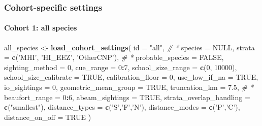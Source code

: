 \documentclass[
]{book}
\newenvironment{Shaded}{\begin{snugshade}}{\end{snugshade}}
\newcommand{\CommentTok}[1]{\textcolor[rgb]{0.56,0.35,0.01}{\textit{#1}}}
\newcommand{\DataTypeTok}[1]{\textcolor[rgb]{0.13,0.29,0.53}{#1}}
\newcommand{\DecValTok}[1]{\textcolor[rgb]{0.00,0.00,0.81}{#1}}
\newcommand{\FloatTok}[1]{\textcolor[rgb]{0.00,0.00,0.81}{#1}}
\newcommand{\KeywordTok}[1]{\textcolor[rgb]{0.13,0.29,0.53}{\textbf{#1}}}
\newcommand{\NormalTok}[1]{#1}
\newcommand{\OperatorTok}[1]{\textcolor[rgb]{0.81,0.36,0.00}{\textbf{#1}}}
\newcommand{\OtherTok}[1]{\textcolor[rgb]{0.56,0.35,0.01}{#1}}
\newcommand{\StringTok}[1]{\textcolor[rgb]{0.31,0.60,0.02}{#1}}
\begin{document}
\hypertarget{cohort-specific-settings-2}{%
\subsubsection*{Cohort-specific settings}\label{cohort-specific-settings-2}}

\hypertarget{cohort-1-all-species-1}{%
\paragraph{Cohort 1: all species}\label{cohort-1-all-species-1}}

\begin{Shaded}
\begin{Highlighting}[]
\NormalTok{all_species <-}\StringTok{ }\KeywordTok{load_cohort_settings}\NormalTok{(}
  \DataTypeTok{id =} \StringTok{"all"}\NormalTok{, }\CommentTok{# *}
  \DataTypeTok{species =} \OtherTok{NULL}\NormalTok{, }
  \DataTypeTok{strata =} \KeywordTok{c}\NormalTok{(}\StringTok{'MHI'}\NormalTok{, }\StringTok{'HI_EEZ'}\NormalTok{, }\StringTok{'OtherCNP'}\NormalTok{), }\CommentTok{# *}
  \DataTypeTok{probable_species =} \OtherTok{FALSE}\NormalTok{,}
  \DataTypeTok{sighting_method =} \DecValTok{0}\NormalTok{,}
  \DataTypeTok{cue_range =} \DecValTok{0}\OperatorTok{:}\DecValTok{7}\NormalTok{,}
  \DataTypeTok{school_size_range =} \KeywordTok{c}\NormalTok{(}\DecValTok{0}\NormalTok{, }\DecValTok{10000}\NormalTok{),}
  \DataTypeTok{school_size_calibrate =} \OtherTok{TRUE}\NormalTok{,}
  \DataTypeTok{calibration_floor =} \DecValTok{0}\NormalTok{,}
  \DataTypeTok{use_low_if_na =} \OtherTok{TRUE}\NormalTok{,}
  \DataTypeTok{io_sightings =} \DecValTok{0}\NormalTok{,}
  \DataTypeTok{geometric_mean_group =} \OtherTok{TRUE}\NormalTok{,}
  \DataTypeTok{truncation_km =} \FloatTok{7.5}\NormalTok{, }\CommentTok{# *}
  \DataTypeTok{beaufort_range =} \DecValTok{0}\OperatorTok{:}\DecValTok{6}\NormalTok{,}
  \DataTypeTok{abeam_sightings =} \OtherTok{TRUE}\NormalTok{,}
  \DataTypeTok{strata_overlap_handling =} \KeywordTok{c}\NormalTok{(}\StringTok{"smallest"}\NormalTok{),}
  \DataTypeTok{distance_types =} \KeywordTok{c}\NormalTok{(}\StringTok{'S'}\NormalTok{,}\StringTok{'F'}\NormalTok{,}\StringTok{'N'}\NormalTok{),}
  \DataTypeTok{distance_modes =} \KeywordTok{c}\NormalTok{(}\StringTok{'P'}\NormalTok{,}\StringTok{'C'}\NormalTok{),}
  \DataTypeTok{distance_on_off =} \OtherTok{TRUE}
\NormalTok{)}
\end{Highlighting}
\end{Shaded}
\end{document}
